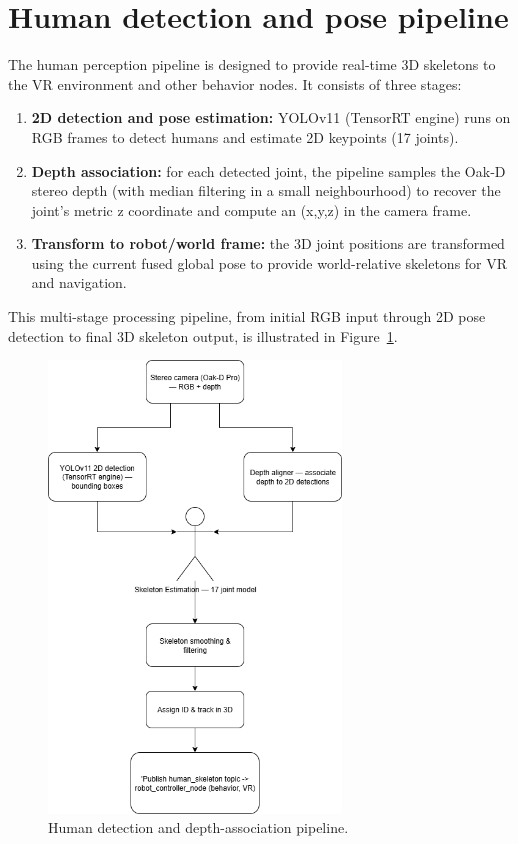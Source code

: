 \section{Human detection and pose pipeline}

The human perception pipeline is designed to provide real-time 3D skeletons to the VR environment and other behavior nodes. It consists of three stages:

\begin{enumerate}
	\item \textbf{2D detection and pose estimation:} YOLOv11 (TensorRT engine) runs on RGB frames to detect humans and estimate 2D keypoints (17 joints).
	\item \textbf{Depth association:} for each detected joint, the pipeline samples the Oak‑D stereo depth (with median filtering in a small neighbourhood) to recover the joint's metric z coordinate and compute an (x,y,z) in the camera frame.
	\item \textbf{Transform to robot/world frame:} the 3D joint positions are transformed using the current fused global pose to provide world-relative skeletons for VR and navigation.
\end{enumerate}

This multi-stage processing pipeline, from initial RGB input through 2D pose detection to final 3D skeleton output, is illustrated in Figure~\ref{fig-human-pipeline}.

\begin{figure}[H]
	\centering
	\includegraphics[height=12cm]{Images/human_pipeline.png}
	\caption{Human detection and depth-association pipeline.}\label{fig-human-pipeline}
\end{figure}

